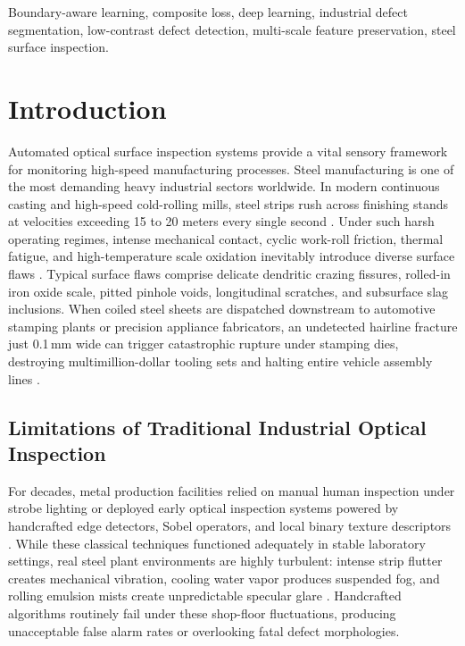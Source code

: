 \documentclass{ieeeaccess}
\begin{document}
\begin{keywords}
Boundary-aware learning, composite loss, deep learning, industrial defect segmentation, low-contrast defect detection, multi-scale feature preservation, steel surface inspection.
\end{keywords}

\titlepgskip=-15pt

\maketitle

\section{Introduction}
\label{sec:introduction}
Automated optical surface inspection systems provide a vital sensory framework for monitoring high-speed manufacturing processes. Steel manufacturing is one of the most demanding heavy industrial sectors worldwide. In modern continuous casting and high-speed cold-rolling mills, steel strips rush across finishing stands at velocities exceeding 15 to 20 meters every single second \cite{survey2020}. Under such harsh operating regimes, intense mechanical contact, cyclic work-roll friction, thermal fatigue, and high-temperature scale oxidation inevitably introduce diverse surface flaws \cite{song2013neu}. Typical surface flaws comprise delicate dendritic crazing fissures, rolled-in iron oxide scale, pitted pinhole voids, longitudinal scratches, and subsurface slag inclusions. When coiled steel sheets are dispatched downstream to automotive stamping plants or precision appliance fabricators, an undetected hairline fracture just 0.1\,mm wide can trigger catastrophic rupture under stamping dies, destroying multimillion-dollar tooling sets and halting entire vehicle assembly lines \cite{survey2020, mao2025csdd}.

\subsection{Limitations of Traditional Industrial Optical Inspection}
\label{sec:intro_limitations}
For decades, metal production facilities relied on manual human inspection under strobe lighting or deployed early optical inspection systems powered by handcrafted edge detectors, Sobel operators, and local binary texture descriptors \cite{survey2020}. While these classical techniques functioned adequately in stable laboratory settings, real steel plant environments are highly turbulent: intense strip flutter creates mechanical vibration, cooling water vapor produces suspended fog, and rolling emulsion mists create unpredictable specular glare \cite{krassnig2025ispad}. Handcrafted algorithms routinely fail under these shop-floor fluctuations, producing unacceptable false alarm rates or overlooking fatal defect morphologies.
\end{document}
